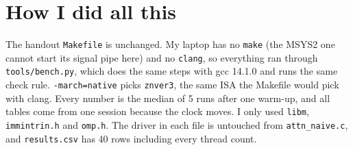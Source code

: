 \documentclass[10pt,a4paper]{article}
\newcommand{\code}[1]{\texttt{\small #1}}
\newcommand{\var}[1]{\texttt{#1}}
\begin{document}
\section*{How I did all this}

The handout \var{Makefile} is unchanged. My laptop has no \var{make} (the MSYS2
one cannot start its signal pipe here) and no \var{clang}, so everything ran
through \var{tools/bench.py}, which does the same steps with gcc 14.1.0 and runs
the same check rule. \code{-march=native} picks \var{znver3}, the same ISA the
Makefile would pick with clang. Every number is the median of 5 runs after one
warm-up, and all tables come from one session because the clock moves. I only
used \var{libm}, \var{immintrin.h} and \var{omp.h}. The driver in each file is
untouched from \var{attn\_naive.c}, and \var{results.csv} has 40 rows including
every thread count.
\end{document}
